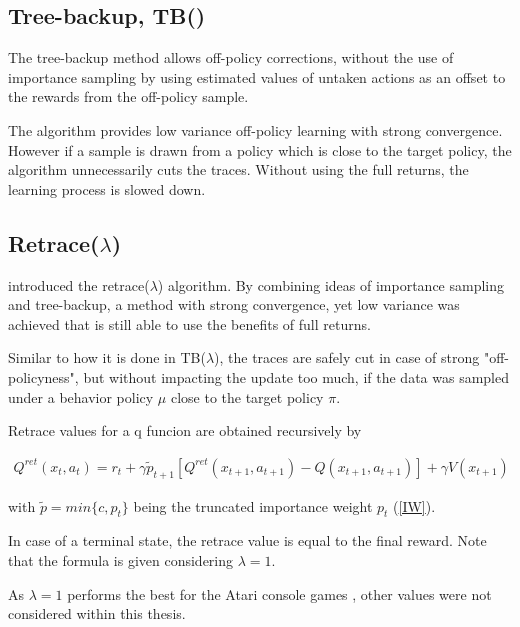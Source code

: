\subsection{Tree-backup, TB(\lambda)}

The tree-backup method allows off-policy corrections, without the use of importance sampling by using estimated values of untaken actions as an offset to the rewards from the off-policy sample. \citet{Precup00}

The algorithm provides low variance off-policy learning with strong convergence.
However if a sample is drawn from a policy which is close to the target policy, the algorithm unnecessarily cuts the traces. Without using the full returns, the learning process is slowed down.
\pagebreak
\subsection{Retrace($\lambda$)}

\citet{Munos16} introduced the retrace($\lambda$) algorithm. By combining ideas of importance sampling and tree-backup, a method with strong convergence, yet low variance was achieved that is still able to use the benefits of full returns.

Similar to how it is done in TB($\lambda$), the traces are safely cut in case of strong "off-policyness", but without impacting the update too much, if the data was sampled under a behavior policy $\mu$ close to the target policy $\pi$.

Retrace values for a q funcion are obtained recursively by

\begin{align}
{
Q^{ret}(x_t,a_t)=r_t+\gamma \tilde{p}_{t+1} [Q^{ret}(x_{t+1},a_{t+1} ) -  Q(x_{t+1},a_{t+1})] + \gamma V(x_{t+1})
}
\label{qretrace}
\end{align}

with $\tilde{p} = min\{c,p_t\}$ being the truncated importance weight $p_t$ (\ref{IW}).

In case of a terminal state, the retrace value is equal to the final reward.
Note that the formula is given considering $\lambda = 1$.

As $\lambda = 1$ performs the best for the Atari console games \citep{Munos16}, other values were not considered within this thesis.

\pagebreak
